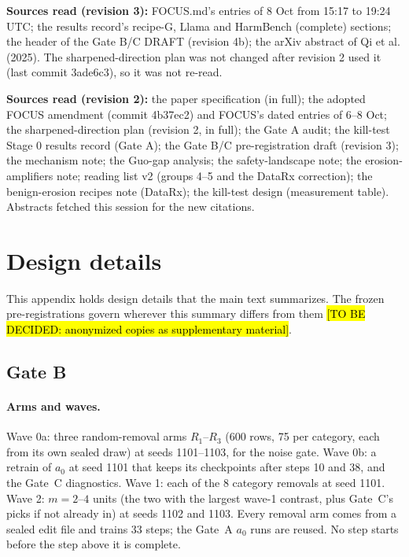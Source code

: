 \documentclass{article}
\theoremstyle{plain}
\theoremstyle{definition}
\theoremstyle{remark}
\newcommand{\ph}[1]{\hl{#1}}
\begin{document}
\textbf{Sources read (revision 3):} FOCUS.md's entries of 8 Oct from 15:17 to
19:24 UTC; the results record's recipe-G, Llama and HarmBench (complete)
sections; the header of the Gate B/C DRAFT (revision 4b); the arXiv abstract of
Qi et al. (2025). The sharpened-direction plan was not changed after revision 2
used it (last commit 3ade6c3), so it was not re-read.

\textbf{Sources read (revision 2):} the paper specification (in full); the
adopted FOCUS amendment (commit 4b37ec2) and FOCUS's dated entries of 6--8 Oct;
the sharpened-direction plan (revision 2, in full); the Gate A audit; the
kill-test Stage 0 results record (Gate A); the Gate B/C pre-registration draft
(revision 3); the mechanism note; the Guo-gap analysis; the safety-landscape
note; the erosion-amplifiers note; reading list v2 (groups 4--5 and the DataRx
correction); the benign-erosion recipes note (DataRx); the kill-test design
(measurement table). Abstracts fetched this session for the new citations.

\endgroup

\newpage
\section{Design details}
\label{app:design}

This appendix holds design details that the main text summarizes. The frozen
pre-registrations govern wherever this summary differs from them
\ph{[TO BE DECIDED: anonymized copies as supplementary material]}.

\subsection{Gate B}
\label{app:gateb}

\paragraph{Arms and waves.}
Wave 0a: three random-removal arms $R_1$--$R_3$ (600 rows, 75 per category,
each from its own sealed draw) at seeds 1101--1103, for the noise gate. Wave
0b: a retrain of $a_0$ at seed 1101 that keeps its checkpoints after steps 10
and 38, and the Gate~C diagnostics. Wave 1: each of the 8 category removals at
seed 1101. Wave 2: $m = 2$--$4$ units (the two with the largest wave-1
contrast, plus Gate~C's picks if not already in) at seeds 1102 and 1103. Every
removal arm comes from a sealed edit file and trains 33 steps; the Gate~A
$a_0$ runs are reused. No step starts before the step above it is complete.
\end{document}
